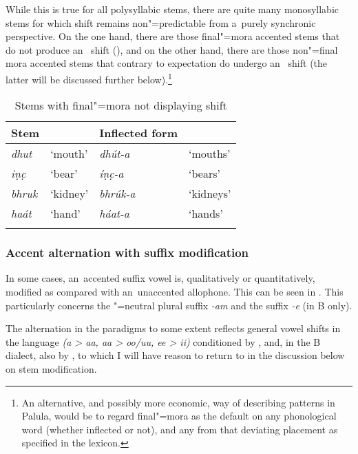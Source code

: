 While this is true for all polysyllabic stems, there are quite many monosyllabic stems for which  shift remains non"=predictable from a~purely synchronic perspective. On the one hand, there are those final"=mora accented stems that do not produce an~ shift (), and on the other hand, there are those non"=final mora accented stems that contrary to expectation do undergo an~ shift (the latter will be discussed further below).\footnote{An alternative, and possibly more economic, way of describing  patterns in Palula, would be to regard final"=mora  as the default  on any phonological word (whether inflected or not), and any from that deviating placement as specified in the lexicon.}



\begin{table}[p]
\caption{ Stems with final"=mora  not displaying  shift}
\begin{tabularx}{\textwidth}{XXXX}
\lsptoprule
Stem &
&
Inflected form &
\\\midrule
\textit{dhut} &
`mouth' &
\textit{dhút-a} &
`mouths'\\
\textit{iṇc̣} &
`bear' &
\textit{íṇc̣-a} &
`bears'\\
\textit{bhruk} &
`kidney' &
\textit{bhrúk-a} &
`kidneys'\\
\textit{haát} &
`hand' &
\textit{háat-a} &
`hands'\\\lspbottomrule
\end{tabularx}
\label{tab:3-10}
\end{table}

\subsubsection*{Accent alternation with suffix modification}

In some cases, an~accented suffix vowel is, qualitatively or quantitatively, modified as compared with an~unaccented allophone. This can be seen in . This particularly concerns the
"=neutral plural  suffix \textit{-am} and the  suffix \textit{-e} (in B only).

The alternation in the paradigms to some extent reflects general vowel shifts in the language
\textit{(a {\textgreater} aa, aa {\textgreater} oo/uu, ee {\textgreater} ii)} conditioned by ,
and, in the B dialect, also by , to which I will have reason to return to in the
discussion below on stem modification.

